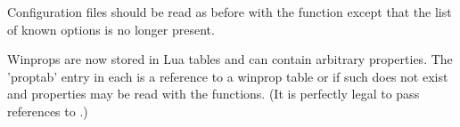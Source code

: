 Configuration files should be read as before with the function
except that the list of known options is no longer present.

Winprops are now stored in Lua tables and can contain arbitrary
properties. The 'proptab' entry in each  is a reference
to a winprop table or  if such does not exist
and properties may be read with the  functions.
(It is perfectly legal to pass  references to
.)

